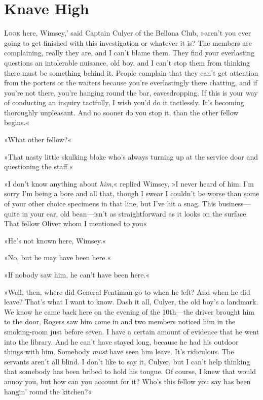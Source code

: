 \chapter{Knave High}

\lettrine[lines=4,ante=‘]{L}{ook} here, Wimsey,' said Captain Culyer of the Bellona Club, »aren't you ever going to get finished with this investigation or whatever it is? The members are complaining, really they are, and I can't blame them. They find your everlasting questions an intolerable nuisance, old boy, and I can't stop them from thinking there must be something behind it. People complain that they can't get attention from the porters or the waiters because you're everlastingly there chatting, and if you're not there, you're hanging round the bar, eavesdropping. If this is your way of conducting an inquiry tactfully, I wish you'd do it tactlessly. It's becoming thoroughly unpleasant. And no sooner do you stop it, than the other fellow begins.«

»What other fellow?«

»That nasty little skulking bloke who's always turning up at the service door and questioning the staff.«

»I don't know anything about \textit{him},« replied Wimsey, »I never heard of him. I'm sorry I'm being a bore and all that, though I swear I couldn't be worse than some of your other choice specimens in that line, but I've hit a snag. This business—quite in your ear, old bean—isn't as straightforward as it looks on the surface. That fellow Oliver whom I mentioned to you\longdash«

»He's not known here, Wimsey.«

»No, but he may have been here.«

»If nobody saw him, he can't have been here.«

»Well, then, where did General Fentiman go to when he left? And when he did leave? That's what I want to know. Dash it all, Culyer, the old boy's a landmark. We know he came back here on the evening of the 10th—the driver brought him to the door, Rogers saw him come in and two members noticed him in the smoking-room just before seven. I have a certain amount of evidence that he went into the library. And he can't have stayed long, because he had his outdoor things with him. Somebody \textit{must} have seen him leave. It's ridiculous. The servants aren't all blind. I don't like to say it, Culyer, but I can't help thinking that somebody has been bribed to hold his tongue\textellipsis. Of course, I knew that would annoy you, but how can you account for it? Who's this fellow you say has been hangin' round the kitchen?«

